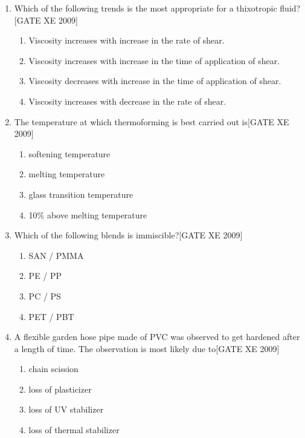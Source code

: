 \documentclass[journal,12pt,onecolumn]{IEEEtran}
\theoremstyle{remark}
\begin{document}
\begin{enumerate}
    \item Which of the following trends is the most appropriate for a thixotropic fluid?\hfill[GATE XE 2009]
    \begin{multicols}{2}
    \begin{enumerate}
        \item Viscosity increases with increase in the rate of shear. 
        \item Viscosity increases with increase in the time of application of shear. 
        \item Viscosity decreases with increase in the time of application of shear. 
        \item Viscosity increases with decrease in the rate of shear.
    \end{enumerate}
    \end{multicols}

   \item The temperature at which thermoforming is best carried out is\hfill[GATE XE 2009]
   \begin{multicols}{2}
    \begin{enumerate}
        \item softening temperature 
        \item melting temperature 
        \item glass transition temperature 
        \item 10\% above melting temperature
    \end{enumerate}
    \end{multicols}

    \item  Which of the following blends is immiscible?\hfill[GATE XE 2009]
    \begin{multicols}{2}
    \begin{enumerate}
        \item SAN / PMMA 
        \item PE / PP 
        \item PC / PS 
        \item PET / PBT
    \end{enumerate}
    \end{multicols}

   \item A flexible garden hose pipe made of PVC was observed to get hardened after a length of time. The observation is most likely due to\hfill[GATE XE 2009]
   \begin{multicols}{2}
    \begin{enumerate}
        \item chain scission 
        \item loss of plasticizer 
        \item loss of UV stabilizer 
        \item loss of thermal stabilizer
    \end{enumerate}
    \end{multicols}


\end{enumerate}
\end{document}
